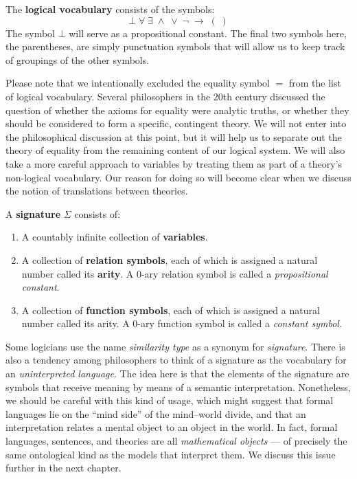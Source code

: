 \begin{defn} The \textbf{logical vocabulary} consists of the symbols:
  \[ \bot \; \forall \; \exists \; \wedge \; \vee \; \neg \; \to \; (
    \; ) \] The symbol
  $\bot$ will serve as a propositional constant.  The final two
  symbols here, the parentheses, are simply punctuation symbols that
  will allow us to keep track of groupings of the other
  symbols. \end{defn}

Please note that we intentionally excluded the equality symbol $=$
from the list of logical vocabulary.  Several philosophers in the 20th
century discussed the question of whether the axioms for equality were
analytic truths, or whether they should be considered to form a
specific, contingent theory.  We will not enter into the philosophical
discussion at this point, but it will help us to separate out the
theory of equality from the remaining content of our logical system.
We will also take a more careful approach to variables by treating
them as part of a theory's non-logical vocabulary.  Our reason for
doing so will become clear when we discuss the notion of translations
between theories.

\begin{defn} A \textbf{signature} $\Sigma$ consists of:
  \begin{enumerate} \item A countably infinite collection of
    \textbf{variables}.
  \item A collection of \textbf{relation symbols}, each of which is
    assigned a natural number called its \textbf{arity}.  A $0$-ary
    relation symbol is called a \emph{propositional constant}.
  \item A collection of \textbf{function symbols}, each of which is
    assigned a natural number called its arity.  A $0$-ary function
    symbol is called a \emph{constant symbol}. \end{enumerate}
\end{defn}

\begin{disc} Some logicians use the name \emph{similarity type} as a
  synonym for \emph{signature}.  There is also a tendency among
  philosophers to think of a signature as the vocabulary for an
  \emph{uninterpreted language}.  The idea here is that the elements
  of the signature are symbols that receive meaning by means of a
  semantic interpretation.  Nonetheless, we should be careful with
  this kind of usage, which might suggest that formal languages lie on
  the ``mind side'' of the mind--world divide, and that an
  interpretation relates a mental object to an object in the world.
  In fact, formal languages, sentences, and theories are all
  \textit{mathematical objects} --- of precisely the same ontological
  kind as the models that interpret them.  We discuss this issue
  further in the next chapter.   \end{disc}

